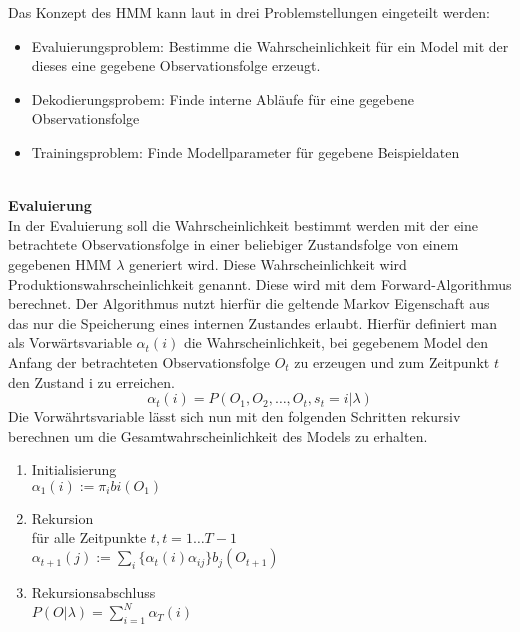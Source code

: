 Das Konzept des \acl{HMM} kann laut \cite{rabiner} in drei Problemstellungen eingeteilt werden:
\begin{itemize}
  \item Evaluierungsproblem: Bestimme die Wahrscheinlichkeit für ein Model mit
  der dieses eine gegebene Observationsfolge erzeugt.
  \item Dekodierungsprobem: Finde interne Abläufe für eine gegebene Observationsfolge
  \item Trainingsproblem: Finde Modellparameter für gegebene Beispieldaten
\end{itemize}
\\
\textbf{Evaluierung} \\
In der Evaluierung soll die Wahrscheinlichkeit bestimmt werden mit der eine
betrachtete Observationsfolge in einer beliebiger Zustandsfolge von einem
gegebenen \acl{HMM} \(\lambda\) generiert wird. Diese Wahrscheinlichkeit wird
Produktionswahrscheinlichkeit genannt. Diese wird mit dem Forward-Algorithmus
berechnet. Der Algorithmus nutzt hierfür die geltende Markov Eigenschaft
aus das nur die Speicherung eines internen Zustandes erlaubt. Hierfür definiert
man als Vorwärtsvariable \(\alpha_{t}(i)\) die Wahrscheinlichkeit, bei
gegebenem Model \lampda den Anfang der betrachteten Observationsfolge \(O_{t}\)
zu erzeugen und zum Zeitpunkt \(t\) den Zustand i zu erreichen.
\begin{equation}
\alpha_{t}(i) = P(O_{1},O_{2},\ldots,O_{t},s_{t}=i|\lambda)
\end{equation}
Die Vorwährtsvariable lässt sich nun mit den folgenden Schritten rekursiv
berechnen um die Gesamtwahrscheinlichkeit des Models zu erhalten.
\begin{enumerate}
  \item Initialisierung\\
		$\alpha_{1}(i) := \pi_{i}b{i}(O_{1})$
  \item Rekursion\\
	für alle Zeitpunkte \(t, t=1 \ldots T-1\)\\
	\(\alpha_{t+1}(j) :=
	\sum\limits_{i}\{\alpha_{t}(i)\alpha_{ij}\}b_{j}(O_{t+1})\)
  \item Rekursionsabschluss\\
  	\(P(O|\lambda) = \sum\limits_{i=1}^N \alpha_{T}(i)\)
\end{enumerate}



